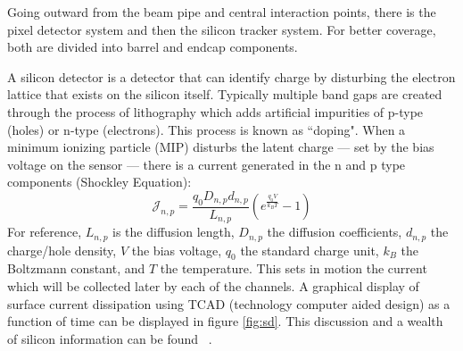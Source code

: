 Going outward from the beam pipe and central interaction points, there is the pixel detector system and then the silicon tracker system. For better coverage, both are divided into barrel and endcap components. 

A silicon detector is a detector that can identify charge by disturbing the electron lattice that exists on the silicon itself. 
Typically multiple band gaps are created through the process of lithography which adds artificial impurities of p-type (holes) or n-type (electrons). This process is known as ``doping". When a minimum ionizing particle (MIP) disturbs the latent charge --- set by the bias voltage on the sensor --- there is a current generated in the n and p type components (Shockley Equation):
\begin{equation}
\label{eq:shockleyn}
\mathcal{J}_{n,p} = \frac{q_0 D_{n,p} d_{n,p}}{L_{n,p}}\left(e^{\frac{q_0 V}{k_B T}} - 1 \right)
\end{equation}
For reference, $L_{n,p}$ is the diffusion length, $D_{n,p}$ the diffusion coefficients, $d_{n,p}$ the charge/hole density, $V$ the bias voltage, $q_0$ the standard charge unit, $k_B$ the Boltzmann constant, and $T$ the temperature. 
This sets in motion the current which will be collected later by each of the channels. A graphical display of surface current dissipation using TCAD (technology computer aided design) as a function of time can be displayed in figure \ref{fig:sd}. This discussion and a wealth of silicon information can be found ~\cite{Eichhorn:2112017}.

